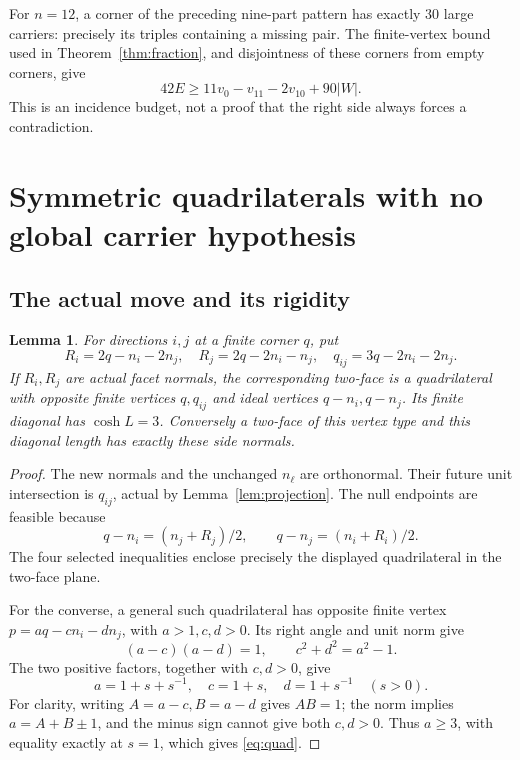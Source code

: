\documentclass[11pt]{article}
\newtheorem{lemma}[theorem]{Lemma}
\theoremstyle{definition}\newtheorem{definition}[theorem]{Definition}
\theoremstyle{remark}\newtheorem{remark}[theorem]{Remark}
\begin{document}
For \(n=12\), a corner of the preceding nine-part pattern has exactly
\(30\) large carriers: precisely its triples containing a missing
pair. The finite-vertex bound used in Theorem~\ref{thm:fraction},
and disjointness of these corners from empty corners, give
\[
 42E\ge11v_0-v_{11}-2v_{10}+90|W|.
\]
This is an incidence budget, not a proof that the right side always
forces a contradiction.

\section{Symmetric quadrilaterals with no global carrier hypothesis}
\subsection{The actual move and its rigidity}
\begin{lemma}\label{lem:quad}
For directions \(i,j\) at a finite corner \(q\), put
\begin{equation}\label{eq:quad}
 R_i=2q-n_i-2n_j,\quad R_j=2q-2n_i-n_j,\quad
 q_{ij}=3q-2n_i-2n_j.
\end{equation}
If \(R_i,R_j\) are actual facet normals, the corresponding two-face
is a quadrilateral with opposite finite vertices \(q,q_{ij}\)
and ideal vertices \(q-n_i,q-n_j\). Its finite diagonal has
\(\cosh L=3\). Conversely a two-face of this vertex type and this
diagonal length has exactly these side normals.
\end{lemma}
\begin{proof}
The new normals and the unchanged \(n_\ell\) are orthonormal.
Their future unit intersection is \(q_{ij}\), actual by
Lemma~\ref{lem:projection}. The null endpoints are feasible because
\[
 q-n_i=(n_j+R_j)/2,\qquad q-n_j=(n_i+R_i)/2.
\]
The four selected inequalities enclose precisely the displayed
quadrilateral in the two-face plane.

For the converse, a general such quadrilateral has opposite finite
vertex \(p=a q-c n_i-d n_j\), with \(a>1,c,d>0\).
Its right angle and unit norm give
\[
 (a-c)(a-d)=1,\qquad c^2+d^2=a^2-1.
\]
The two positive factors, together with \(c,d>0\), give
\[
 a=1+s+s^{-1},\quad c=1+s,\quad d=1+s^{-1}\quad(s>0).
\]
For clarity, writing \(A=a-c,B=a-d\) gives \(AB=1\);
the norm implies \(a=A+B\pm1\), and the minus sign cannot
give both \(c,d>0\). Thus \(a\ge3\), with equality exactly
at \(s=1\), which gives \eqref{eq:quad}.
\end{proof}
\end{document}
